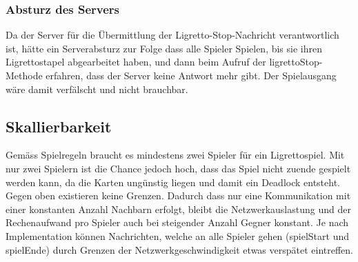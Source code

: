 \subsubsection{Absturz des Servers}
Da der Server für die Übermittlung der Ligretto-Stop-Nachricht verantwortlich ist, hätte ein Serverabsturz zur Folge dass alle Spieler Spielen, bis sie ihren Ligrettostapel abgearbeitet haben, und dann beim Aufruf der ligrettoStop-Methode erfahren, dass der Server keine Antwort mehr gibt. Der Spielausgang wäre damit verfälscht und nicht brauchbar.

\subsection{Skallierbarkeit}

Gemäss Spielregeln braucht es mindestens zwei Spieler für ein Ligrettospiel. Mit nur zwei Spielern ist die Chance jedoch hoch, dass das Spiel nicht zuende gespielt werden kann, da die Karten ungünstig liegen und damit ein Deadlock entsteht. Gegen oben existieren keine Grenzen. Dadurch dass nur eine Kommunikation mit einer konstanten Anzahl Nachbarn erfolgt, bleibt die Netzwerkauslastung und der Rechenaufwand pro Spieler auch bei steigender Anzahl Gegner konstant. Je nach Implementation können Nachrichten, welche an alle Spieler gehen (spielStart und spielEnde) durch Grenzen der Netzwerkgeschwindigkeit etwas verspätet eintreffen.

